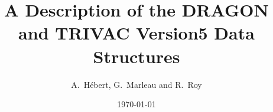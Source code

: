 \documentclass{report}
\begin{document}
\title{A Description of the DRAGON and TRIVAC Version5 Data Structures}

\author{A.~H\'ebert, G.~Marleau and R.~Roy}

\date{\today}




\clearpage
{}
\tableofcontents
\clearpage
{}
\listoftables
\clearpage
{}
\listoffigures

\Debutdutexte

\clearpage
{}
\printindex
\end{document}
